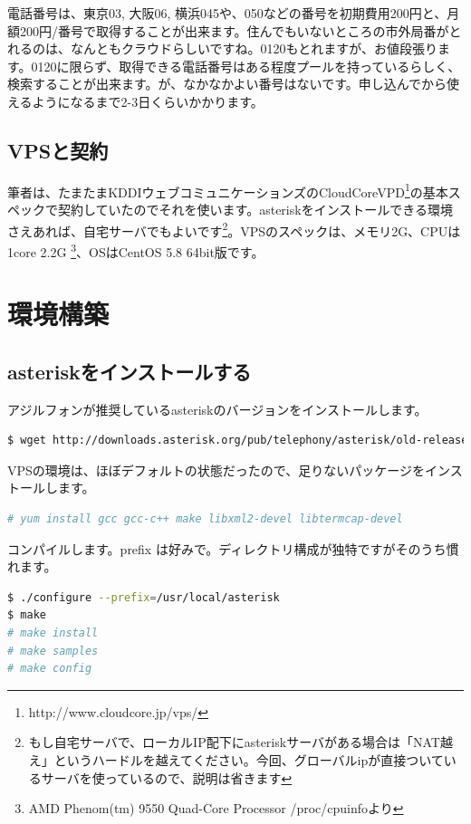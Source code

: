 電話番号は、東京03, 大阪06, 横浜045や、050などの番号を初期費用200円と、月額200円/番号で取得することが出来ます。住んでもいないところの市外局番がとれるのは、なんともクラウドらしいですね。0120もとれますが、お値段張ります。0120に限らず、取得できる電話番号はある程度プールを持っているらしく、検索することが出来ます。が、なかなかよい番号はないです。申し込んでから使えるようになるまで2-3日くらいかかります。

\subsection{VPSと契約}
筆者は、たまたまKDDIウェブコミュニケーションズのCloudCoreVPD\footnote{http://www.cloudcore.jp/vps/}の基本スペックで契約していたのでそれを使います。asteriskをインストールできる環境さえあれば、自宅サーバでもよいです\footnote{もし自宅サーバで、ローカルIP配下にasteriskサーバがある場合は「NAT越え」というハードルを越えてください。今回、グローバルipが直接ついているサーバを使っているので、説明は省きます}。VPSのスペックは、メモリ2G、CPUは1core 2.2G \footnote{AMD Phenom(tm) 9550 Quad-Core Processor /proc/cpuinfoより}、OSはCentOS 5.8 64bit版です。

\section{環境構築}
\subsection{asteriskをインストールする}
アジルフォンが推奨しているasteriskのバージョンをインストールします。

\begin{lstlisting}[language=bash]
$ wget http://downloads.asterisk.org/pub/telephony/asterisk/old-releases/asterisk-1.6.2.9.tar.gz
\end{lstlisting}

VPSの環境は、ほぼデフォルトの状態だったので、足りないパッケージをインストールします。

\begin{lstlisting}[language=bash]
# yum install gcc gcc-c++ make libxml2-devel libtermcap-devel
\end{lstlisting}

コンパイルします。prefix は好みで。ディレクトリ構成が独特ですがそのうち慣れます。

\begin{lstlisting}[language=bash]
$ ./configure --prefix=/usr/local/asterisk
$ make
# make install
# make samples 
# make config
\end{lstlisting}

